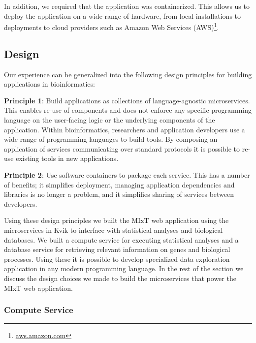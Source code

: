 In addition, we required that the application was containerized. This allows us
to deploy the application on a wide range of hardware, from local installations
to deployments to cloud providers such as Amazon Web Services
(AWS)\footnote{\url{aws.amazon.com}}. 

\subsection*{Design}
Our experience can be generalized into the following design principles for
building applications in bioinformatics: 


\textbf{Principle 1}: Build applications as collections of language-agnostic
microservices. This enables re-use of components and does not enforce any
specific programming language on the user-facing logic or the underlying
components of the application. Within bioinformatics, researchers and
application developers use a wide range of programming languages to build tools.
By composing an application of services communicating over standard protocols it
is possible to re-use existing tools in new applications. 

\textbf{Principle 2}: Use software containers to package each service. This has
a number of benefits; it simplifies deployment, managing application
dependencies and libraries is no longer a problem, and it simplifies sharing of
services between developers. 

Using these design principles we built the MIxT web application using the
microservices in Kvik to interface with statistical analyses and biological
databases.  We built a compute service for executing statistical analyses and a
database service for retrieving relevant information on genes and biological
processes.  Using these it is possible to develop specialized data exploration
application in any modern programming language.  In the rest of the section we
discuss the design choices we made to build the microservices that power the
MIxT web application. 


\subsubsection*{Compute Service}


